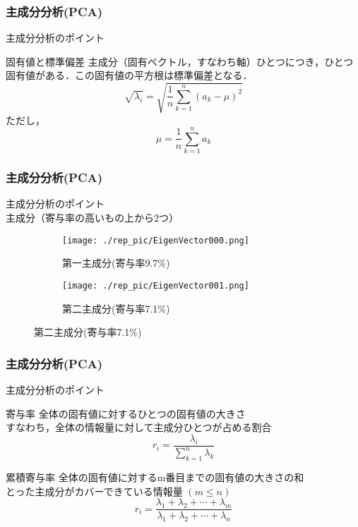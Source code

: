 \documentclass[dvipdfmx]{beamer}
\begin{document}
\begin{frame}
  \frametitle{主成分分析(PCA)}
   主成分分析のポイント
   \begin{block}{固有値と標準偏差}
     主成分（固有ベクトル，すなわち軸）ひとつにつき，ひとつ固有値がある．この固有値の平方根は標準偏差となる．
     \begin{equation}
       \sqrt{\lambda_{i}} = \sqrt{\frac{1}{n} \textstyle\sum_{k=1}^{n}\left(a_{k}-\mu\right)^2}
     \end{equation}
     ただし，\[ \mu = \frac{1}{n} \textstyle\sum_{k=1}^{n}a_{k} \]
    \end{block}
\end{frame}

\begin{frame}
  \frametitle{主成分分析(PCA)}
   主成分分析のポイント \\
   主成分（寄与率の高いもの上から2つ）
   \begin{figure}
     \centering
     \begin{subfigure}{0.4\paperwidth}
       \centering
       \texttt{[image: ./rep\_pic/EigenVector000.png]}
       \caption{第一主成分(寄与率9.7\%)}
     \end{subfigure}
     \begin{subfigure}{0.4\paperwidth}
       \centering
       \texttt{[image: ./rep\_pic/EigenVector001.png]}
       \caption{第二主成分(寄与率7.1\%)}
     \end{subfigure}
   \end{figure}


\end{frame}

\begin{frame}
  \frametitle{主成分分析(PCA)}
   主成分分析のポイント
   \begin{block}{寄与率}
     全体の固有値に対するひとつの固有値の大きさ \\
     すなわち，全体の情報量に対して主成分ひとつが占める割合
     \begin{equation}
       r_{i} = \frac{\lambda_{i}}{ \textstyle\sum_{k=1}^{n}\lambda_{k}}
     \end{equation}
   \end{block}
   \begin{block}{累積寄与率}
     全体の固有値に対するm番目までの固有値の大きさの和 \\
     とった主成分がカバーできている情報量 $\left(m \le n\right)$
     \begin{equation}
       r_{i} = \frac{\lambda_{1}+\lambda_{2}+\cdots+\lambda_{m}}{ \lambda_{1}+\lambda_{2}+\cdots+\lambda_{n}}
     \end{equation}
   \end{block}
\end{frame}
\end{document}
